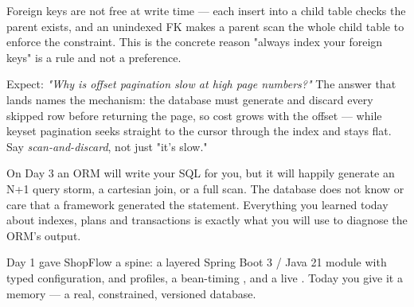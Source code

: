 \begin{dbinsight}
Foreign keys are not free at write time --- each insert into a child table checks the parent exists, and an unindexed FK makes a parent  scan the whole child table to enforce the constraint. This is the concrete reason "always index your foreign keys" is a rule and not a preference.
\end{dbinsight}

\begin{interview}
Expect: \emph{"Why is offset pagination slow at high page numbers?"} The answer that lands names the mechanism: the database must generate and discard every skipped row before returning the page, so cost grows with the offset --- while keyset pagination seeks straight to the cursor through the index and stays flat. Say \emph{scan-and-discard}, not just "it's slow."
\end{interview}

\begin{secwarn}
On Day 3 an ORM will write your SQL for you, but it will happily generate an N+1 query storm, a cartesian join, or a full scan. The database does not know or care that a framework generated the statement. Everything you learned today about indexes, plans and transactions is exactly what you will use to diagnose the ORM's output.
\end{secwarn}


Day 1 gave ShopFlow a spine: a layered Spring Boot 3 / Java 21 module with typed configuration,  and  profiles, a bean-timing , and a live . Today you give it a memory --- a real, constrained, versioned database.


